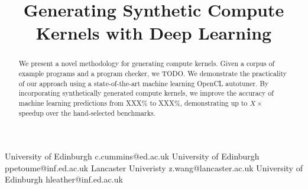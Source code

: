 \documentclass[preprint,nonatbib,10pt,nocopyrightspace]{sigplanconf}
\begin{document}
\setlength{\pdfpageheight}{\paperheight}
\setlength{\pdfpagewidth}{\paperwidth}






\title{Generating Synthetic Compute Kernels with Deep Learning}


           {University of Edinburgh}
           {c.cummins@ed.ac.uk}
           {University of Edinburgh}
           {ppetoume@inf.ed.ac.uk}
           {Lancaster Univeristy}
           {z.wang@lancaster.ac.uk}
           {University of Edinburgh}
           {hleather@inf.ed.ac.uk}

\maketitle

\begin{abstract}
  We present a novel methodology for generating compute kernels. Given
  a corpus of example programs and a program checker, we TODO.%
  We demonstrate the practicality of our approach using a
  state-of-the-art machine learning OpenCL autotuner. By incorporating
  synthetically generated compute kernels, we improve the accuracy of
  machine learning predictions from XXX\% to XXX\%, demonstrating up
  to $X\times$ speedup over the hand-selected benchmarks.
\end{abstract}

\end{document}
